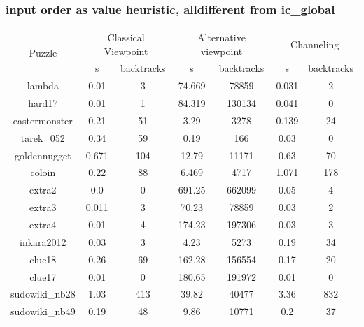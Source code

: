 \documentclass{report}
\begin{document}
\subsubsection{input order as value heuristic, alldifferent from ic\_global}
\begin{table}[h!]
  \begin{tabular}{|c|c|c|c|c|c|c|}
    \hline
    \multirow{2}{*}{Puzzle} &
    \multicolumn{2}{L|}{Classical Viewpoint} &
    \multicolumn{2}{L|}{Alternative viewpoint} &
    \multicolumn{2}{L|}{Channeling} \\
    & s & backtracks & s & backtracks & s & backtracks \\
    \hline
        lambda & 0.01 & 3 & 74.669 & 78859 & 0.031 & 2\\
        hard17 & 0.01 & 1 & 84.319 & 130134 & 0.041 & 0\\
        eastermonster & 0.21 & 51 & 3.29 & 3278 & 0.139 & 24\\
        tarek\_052 & 0.34 & 59 & 0.19 & 166 & 0.03 & 0\\
        goldennugget & 0.671 & 104 & 12.79 & 11171 & 0.63 & 70\\
        coloin & 0.22 & 88 & 6.469 & 4717 & 1.071 & 178\\
        extra2 & 0.0 & 0 & 691.25 & 662099 & 0.05 & 4\\
        extra3 & 0.011 & 3 & 70.23 & 78859 & 0.03 & 2\\
        extra4 & 0.01 & 4 & 174.23 & 197306 & 0.03 & 3\\
        inkara2012 & 0.03 & 3 & 4.23 & 5273 & 0.19 & 34\\
        clue18 & 0.26 & 69 & 162.28 & 156554 & 0.17 & 20\\
        clue17 & 0.01 & 0 & 180.65 & 191972 & 0.01 & 0\\
        sudowiki\_nb28 & 1.03 & 413 & 39.82 & 40477 & 3.36 & 832\\
        sudowiki\_nb49 & 0.19 & 48 & 9.86 & 10771 & 0.2 & 37\\
    \hline
  \end{tabular}
\end{table}
\end{document}
